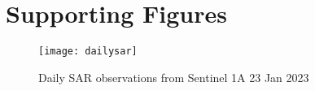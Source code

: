 \documentclass[../main/thesis.tex]{subfiles}
\begin{document}
\section{Supporting Figures}

\begin{figure}
    \texttt{[image: dailysar]}
    \caption{\label{fig:S-sar}Daily SAR observations from Sentinel 1A 23 Jan 2023}
\end{figure}
\end{document}
